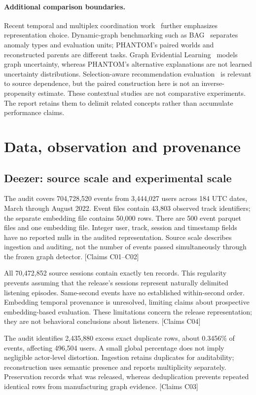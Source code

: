 \documentclass[11pt,letterpaper]{article}
\newcommand{\claims}[1]{{\small\textsf{[Claims #1]}}}
\begin{document}
\paragraph{Additional comparison boundaries.} Recent temporal and multiplex coordination work~\cite{iannucci} further emphasizes representation choice. Dynamic-graph benchmarking such as BAG~\cite{bag} separates anomaly types and evaluation units; PHANTOM's paired worlds and reconstructed parents are different tasks. Graph Evidential Learning~\cite{gel} models graph uncertainty, whereas PHANTOM's alternative explanations are not learned uncertainty distributions. Selection-aware recommendation evaluation~\cite{schnabel} is relevant to source dependence, but the paired construction here is not an inverse-propensity estimate. These contextual studies are not comparative experiments. The report retains them to delimit related concepts rather than accumulate performance claims.

\section{Data, observation and provenance}
\subsection{Deezer: source scale and experimental scale}
The audit covers 704,728,520 events from 3,444,027 users across 184 UTC dates, March through August 2022. Event files contain 43,803 observed track identifiers; the separate embedding file contains 50,000 rows. There are 500 event parquet files and one embedding file. Integer user, track, session and timestamp fields have no reported nulls in the audited representation. Source scale describes ingestion and auditing, not the number of events passed simultaneously through the frozen graph detector. \claims{C01--C02}

All 70,472,852 source sessions contain exactly ten records. This regularity prevents assuming that the release's sessions represent naturally delimited listening episodes. Same-second events have no established within-second order. Embedding temporal provenance is unresolved, limiting claims about prospective embedding-based evaluation. These limitations concern the release representation; they are not behavioral conclusions about listeners. \claims{C04}

The audit identifies 2,435,880 excess exact duplicate rows, about 0.3456\% of events, affecting 496,504 users. A small global percentage does not imply negligible actor-level distortion. Ingestion retains duplicates for auditability; reconstruction uses semantic presence and reports multiplicity separately. Preservation records what was released, whereas deduplication prevents repeated identical rows from manufacturing graph evidence. \claims{C03}
\end{document}
